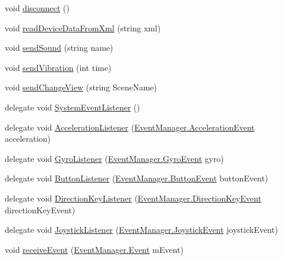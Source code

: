 \begin{DoxyCompactItemize}
\item 
void \hyperlink{class_game_controller_a47e7610a9cddf869968b388926eab62a}{disconnect} ()
\item 
void \hyperlink{class_game_controller_a186282de3ec7fb68cde00368cbfd697d}{read\+Device\+Data\+From\+Xml} (string xml)
\item 
void \hyperlink{class_game_controller_aadac19b966dfc27827a6f68ea15d9cec}{send\+Sound} (string name)
\item 
void \hyperlink{class_game_controller_a662e97a1d293708aade81c6e2afd0a22}{send\+Vibration} (int time)
\item 
void \hyperlink{class_game_controller_a8d4cf54c02ecd7cff7dd3995116efac5}{send\+Change\+View} (string Scene\+Name)
\item 
delegate void \hyperlink{class_game_controller_a6c79406c908b41c4f4520c6789d829e6}{System\+Event\+Listener} ()
\item 
delegate void \hyperlink{class_game_controller_a87b7db4c19ae1dd2ecbf94c6f1be5c90}{Acceleration\+Listener} (\hyperlink{class_event_manager_1_1_acceleration_event}{Event\+Manager.\+Acceleration\+Event} acceleration)
\item 
delegate void \hyperlink{class_game_controller_a5e0106b2e58b70c011fe7f7e9f58ecce}{Gyro\+Listener} (\hyperlink{class_event_manager_1_1_gyro_event}{Event\+Manager.\+Gyro\+Event} gyro)
\item 
delegate void \hyperlink{class_game_controller_a0d4534f57395c87d869dc90a70419e7f}{Button\+Listener} (\hyperlink{class_event_manager_1_1_button_event}{Event\+Manager.\+Button\+Event} button\+Event)
\item 
delegate void \hyperlink{class_game_controller_ae08375a6caed9e49d310f992e6d6f61b}{Direction\+Key\+Listener} (\hyperlink{class_event_manager_1_1_direction_key_event}{Event\+Manager.\+Direction\+Key\+Event} direction\+Key\+Event)
\item 
delegate void \hyperlink{class_game_controller_a653ceafbd20d279abc65adf386a358aa}{Joystick\+Listener} (\hyperlink{class_event_manager_1_1_joystick_event}{Event\+Manager.\+Joystick\+Event} joystick\+Event)
\item 
void \hyperlink{class_game_controller_a5b9e4d1735ec8d689a35ad187aefe1e9}{receive\+Event} (\hyperlink{class_event_manager_1_1_event}{Event\+Manager.\+Event} m\+Event)
\end{DoxyCompactItemize}
